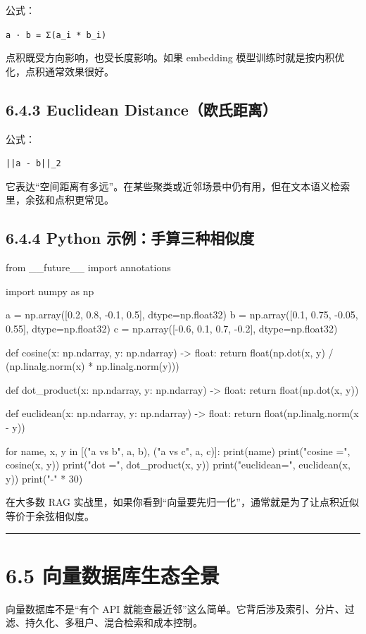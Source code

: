 公式：


\texttt{a · b = Σ(a\_i * b\_i)}


点积既受方向影响，也受长度影响。如果 embedding 模型训练时就是按内积优化，点积通常效果很好。


\subsection{6.4.3 Euclidean Distance（欧氏距离）}

公式：


\texttt{||a - b||\_2}


它表达``空间距离有多远''。在某些聚类或近邻场景中仍有用，但在文本语义检索里，余弦和点积更常见。


\subsection{6.4.4 Python 示例：手算三种相似度}

\begin{codeblock}
from __future__ import annotations

import numpy as np

a = np.array([0.2, 0.8, -0.1, 0.5], dtype=np.float32)
b = np.array([0.1, 0.75, -0.05, 0.55], dtype=np.float32)
c = np.array([-0.6, 0.1, 0.7, -0.2], dtype=np.float32)


def cosine(x: np.ndarray, y: np.ndarray) -> float:
    return float(np.dot(x, y) / (np.linalg.norm(x) * np.linalg.norm(y)))


def dot_product(x: np.ndarray, y: np.ndarray) -> float:
    return float(np.dot(x, y))


def euclidean(x: np.ndarray, y: np.ndarray) -> float:
    return float(np.linalg.norm(x - y))


for name, x, y in [("a vs b", a, b), ("a vs c", a, c)]:
    print(name)
    print("cosine   =", cosine(x, y))
    print("dot      =", dot_product(x, y))
    print("euclidean=", euclidean(x, y))
    print("-" * 30)
\end{codeblock}

在大多数 RAG 实战里，如果你看到``向量要先归一化''，通常就是为了让点积近似等价于余弦相似度。


\bigskip\hrule\bigskip

\section{6.5 向量数据库生态全景}

向量数据库不是``有个 API 就能查最近邻''这么简单。它背后涉及索引、分片、过滤、持久化、多租户、混合检索和成本控制。


